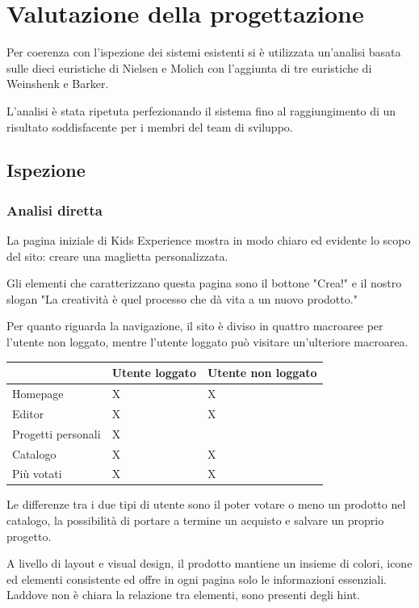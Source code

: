 \documentclass[12pt,italian,]{report}
\begin{document}
\newpage
\hypertarget{valutazione-della-progettazione}{%
\chapter{Valutazione della
progettazione}\label{valutazione-della-progettazione}}

Per coerenza con l'ispezione dei sistemi esistenti si è utilizzata un'analisi basata sulle dieci euristiche di Nielsen e Molich con l'aggiunta di tre euristiche di Weinshenk e Barker.

L'analisi è stata ripetuta perfezionando il sistema fino al raggiungimento di un risultato soddisfacente per i membri del team di sviluppo.

\section{Ispezione}\label{ispezione}

\subsection{Analisi diretta}

La pagina iniziale di Kids Experience mostra in modo chiaro ed evidente lo scopo del sito: creare una maglietta personalizzata. 

Gli elementi che caratterizzano questa pagina sono il bottone "Crea!" e il nostro slogan "La creatività è quel processo che dà vita a un nuovo prodotto."

Per quanto riguarda la navigazione, il sito è diviso in quattro macroaree per l'utente non loggato, mentre l'utente loggato può visitare un'ulteriore macroarea. 

\newpage
\begin{longtable}[]{@{}lll@{}}
\toprule
& Utente loggato & Utente non loggato\tabularnewline
\midrule
\endhead
Homepage & X & X\tabularnewline
Editor & X & X\tabularnewline
Progetti personali & X &\tabularnewline
Catalogo & X & X\tabularnewline
Più votati & X & X\tabularnewline
\bottomrule
\end{longtable}

Le differenze tra i due tipi di utente sono il poter votare o meno un prodotto nel catalogo, la possibilità di portare a termine un acquisto e salvare un proprio progetto.

A livello di layout e visual design, il prodotto mantiene un insieme di colori, icone ed elementi consistente ed offre in ogni pagina solo le informazioni essenziali. Laddove non è chiara la relazione tra elementi, sono presenti degli hint.
\end{document}
